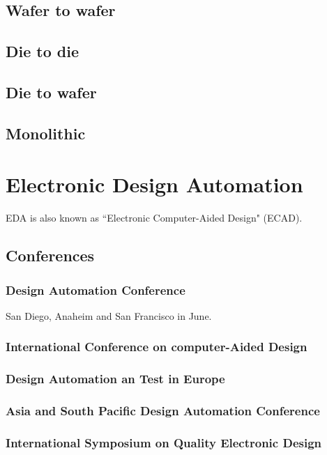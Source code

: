 \documentclass[12pt,a4paper]{article}
\begin{document}
\subsection{Wafer to wafer}

\subsection{Die to die}

\subsection{Die to wafer}

\subsection{Monolithic}

\section{Electronic Design Automation}
EDA is also known as ``Electronic Computer-Aided Design" (ECAD).

\subsection{Conferences}
\subsubsection{Design Automation Conference}
San Diego, Anaheim and San Francisco in June.
\subsubsection{International Conference on computer-Aided Design}
\subsubsection{Design Automation an Test in Europe}
\subsubsection{Asia and South Pacific Design Automation Conference}
\subsubsection{International Symposium on Quality Electronic Design}



\newpage

\glsaddall
\printglossaries

\newpage
% 


\end{document}
